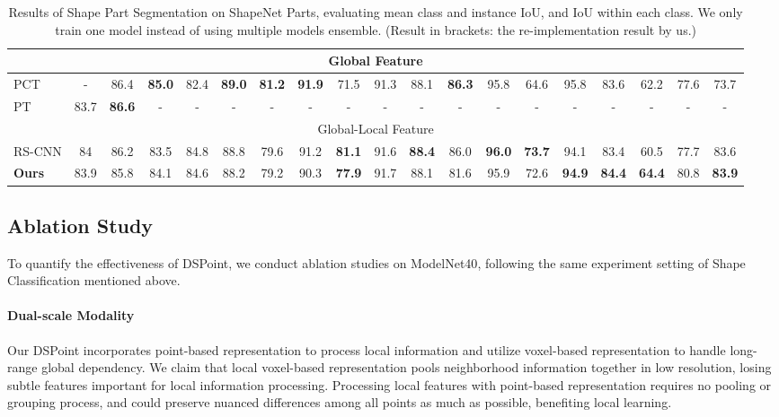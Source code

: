 \documentclass[sigconf]{acmart}
\begin{document}
\begin{table*}[t]
\begin{adjustbox}{width=\textwidth}
\begin{tabular}{l|cc|cccccccccccccccc}
	    \midrule
	    \multicolumn{19}{c}{Global Feature} \\  \midrule PCT\cite{guo2021pct} &- &86.4 &\textbf{85.0} &82.4 &\textbf{89.0} &\textbf{81.2} &\textbf{91.9} &71.5 &91.3 &88.1 &\textbf{86.3} &95.8 &64.6 &95.8 &83.6 &62.2 &77.6 &73.7\\
 		PT\cite{zhao2021point} &83.7 &\textbf{86.6} &- &- &- &- &- &- &- &- &- &- &- &- &- &- &- &- \\
		\midrule
	    \multicolumn{19}{c}{Global-Local Feature} \\ \midrule RS-CNN\cite{liu2019relation} &84 &86.2 &83.5 &84.8 &88.8 &79.6 &91.2 &\textbf{81.1} &91.6 &\textbf{88.4} &86.0 &\textbf{96.0} &\textbf{73.7} &94.1 &83.4 &60.5 &77.7 &83.6\\
\textbf{Ours}  &83.9   &85.8 &84.1 &84.6 &88.2 &79.2 &90.3 &\textbf{77.9} &91.7 &88.1 &81.6 &95.9 &72.6 &\textbf{94.9} &\textbf{84.4} &\textbf{64.4} &80.8 &\textbf{83.9}\\
	\bottomrule
	\end{tabular}
\end{adjustbox}
\caption{Results of Shape Part Segmentation on ShapeNet Parts\cite{wu20143d}, evaluating mean class and instance IoU, and IoU within each class. We only train one model instead of using multiple models ensemble. (Result in brackets: the re-implementation result by us.) }
\vspace*{0pt}
\label{shapenet}
\vspace{-0.2cm}
\end{table*}


\subsection{Ablation Study}

To quantify the effectiveness of DSPoint, we conduct ablation studies on ModelNet40\cite{wu20153d}, following the same experiment setting of Shape Classification mentioned above.

\paragraph{Dual-scale Modality}

Our DSPoint incorporates point-based representation to process local information and utilize voxel-based representation to handle long-range global dependency.  We claim that local voxel-based representation pools neighborhood information together in low resolution, losing subtle features important for local information processing.  Processing local features with point-based representation requires no pooling or grouping process, and could preserve nuanced differences among all points as much as possible, benefiting local learning.  
\end{document}
